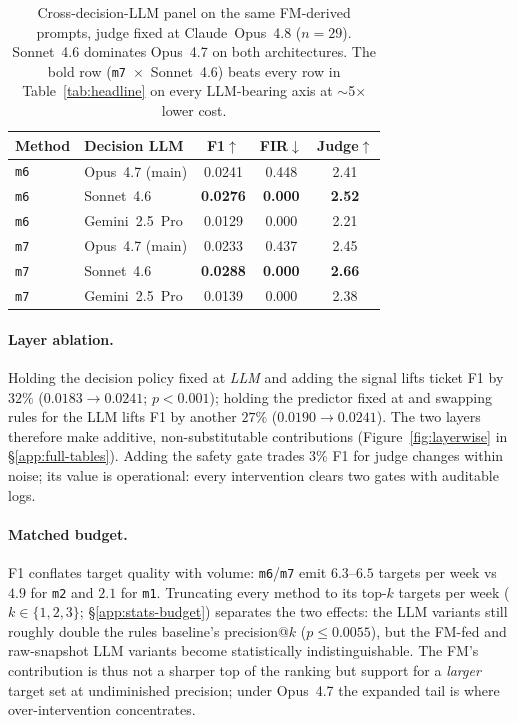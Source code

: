 \begin{table}[t]
\centering\small
\setlength{\tabcolsep}{4pt}
\begin{tabular}{@{}llccc@{}}
\toprule
Method & Decision LLM & F1$\uparrow$ & FIR$\downarrow$ & Judge$\uparrow$ \\
\midrule
\texttt{m6} & Opus~4.7 (main)  & 0.0241 & 0.448 & 2.41 \\
\texttt{m6} & Sonnet~4.6       & \textbf{0.0276} & \textbf{0.000} & \textbf{2.52} \\
\texttt{m6} & Gemini~2.5~Pro   & 0.0129 & 0.000 & 2.21 \\
\midrule
\texttt{m7} & Opus~4.7 (main)  & 0.0233 & 0.437 & 2.45 \\
\texttt{m7} & Sonnet~4.6       & \textbf{0.0288} & \textbf{0.000} & \textbf{2.66} \\
\texttt{m7} & Gemini~2.5~Pro   & 0.0139 & 0.000 & 2.38 \\
\bottomrule
\end{tabular}
\caption{Cross-decision-LLM panel on the same FM-derived prompts,
judge fixed at Claude~Opus~4.8 ($n\!=\!29$). Sonnet~4.6 dominates
Opus~4.7 on both architectures. The bold row
(\texttt{m7}~$\times$~Sonnet~4.6) beats every row in
Table~\ref{tab:headline} on every LLM-bearing axis at
$\sim$5$\times$ lower cost.}
\label{tab:decision-panel}
\end{table}

\paragraph{Layer ablation.}
Holding the decision policy fixed at \emph{LLM} and adding the
\fmname{} signal lifts ticket F1 by $32\%$
($0.0183\!\to\!0.0241$; $p\!<\!0.001$); holding the predictor
fixed at \fmname{} and swapping rules for the LLM lifts F1 by
another $27\%$ ($0.0190\!\to\!0.0241$). The two layers therefore
make additive, non-substitutable contributions
(Figure~\ref{fig:layerwise} in \S\ref{app:full-tables}). Adding
the safety gate trades $3\%$ F1 for judge changes within noise;
its value is operational: every intervention clears two gates
with auditable logs.

\paragraph{Matched budget.}
F1 conflates target quality with volume:
\texttt{m6}/\texttt{m7} emit $6.3$--$6.5$ targets per week vs
$4.9$ for \texttt{m2} and $2.1$ for \texttt{m1}. Truncating every
method to its top-$k$ targets per week ($k\!\in\!\{1,2,3\}$;
\S\ref{app:stats-budget}) separates the two effects: the LLM
variants still roughly double the rules baseline's precision@$k$
($p\!\leq\!0.0055$), but the FM-fed and raw-snapshot LLM variants
become statistically indistinguishable. The FM's contribution is
thus not a sharper top of the ranking but support for a
\emph{larger} target set at undiminished precision; under
Opus~4.7 the expanded tail is where over-intervention
concentrates.

